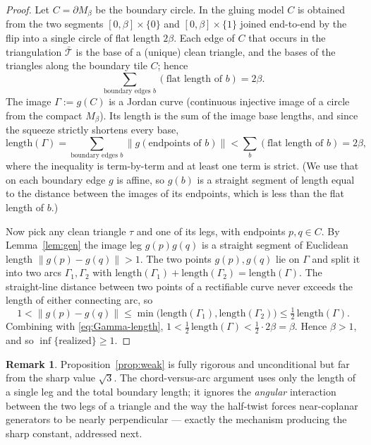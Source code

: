 \documentclass[11pt]{article}
\theoremstyle{definition}
\newtheorem{remark}{Remark}
\newcommand{\bd}{\partial}
\newcommand{\norm}[1]{\lVert #1 \rVert}
\begin{document}
\begin{proof}
Let $C=\bd M_\beta$ be the boundary circle. In the gluing model $C$ is obtained from the two
segments $[0,\beta]\times\{0\}$ and $[0,\beta]\times\{1\}$ joined end-to-end by the flip into
a single circle of flat length $2\beta$. Each edge of $C$ that occurs in the triangulation
$\bar{\mathcal T}$ is the base of a (unique) clean triangle, and the bases of the triangles
along the boundary tile $C$; hence
\begin{equation}\label{eq:boundary-length}
\sum_{\text{boundary edges }b}(\text{flat length of }b)=2\beta .
\end{equation}
The image $\Gamma:=g(C)$ is a Jordan curve (continuous injective image of a circle from the
compact $M_\beta$). Its length is the sum of the image base lengths, and since the squeeze
strictly shortens every base,
\begin{equation}\label{eq:Gamma-length}
\mathrm{length}(\Gamma)=\sum_{\text{boundary edges }b}\norm{g(\text{endpoints of }b)}
<\sum_b(\text{flat length of }b)=2\beta ,
\end{equation}
where the inequality is term-by-term and at least one term is strict. (We use that on each
boundary edge $g$ is affine, so $g(b)$ is a straight segment of length equal to the distance
between the images of its endpoints, which is less than the flat length of $b$.)

Now pick any clean triangle $\tau$ and one of its legs, with endpoints $p,q\in C$. By
Lemma~\ref{lem:gen} the image leg $g(p)g(q)$ is a straight segment of Euclidean length
$\norm{g(p)-g(q)}>1$. The two points $g(p),g(q)$ lie on $\Gamma$ and split it into two arcs
$\Gamma_1,\Gamma_2$ with $\mathrm{length}(\Gamma_1)+\mathrm{length}(\Gamma_2)=
\mathrm{length}(\Gamma)$. The straight-line distance between two points of a rectifiable
curve never exceeds the length of either connecting arc, so
\[
1<\norm{g(p)-g(q)}\le\min\bigl(\mathrm{length}(\Gamma_1),\mathrm{length}(\Gamma_2)\bigr)
\le\tfrac12\,\mathrm{length}(\Gamma).
\]
Combining with \eqref{eq:Gamma-length}, $1<\tfrac12\,\mathrm{length}(\Gamma)<\tfrac12\cdot
2\beta=\beta$. Hence $\beta>1$, and so $\inf\{\text{realized}\}\ge1$.
\end{proof}

\begin{remark}
Proposition~\ref{prop:weak} is fully rigorous and unconditional but far from the sharp value
$\sqrt3$. The chord-versus-arc argument uses only the length of a single leg and the total
boundary length; it ignores the \emph{angular} interaction between the two legs of a triangle
and the way the half-twist forces near-coplanar generators to be nearly perpendicular ---
exactly the mechanism producing the sharp constant, addressed next.
\end{remark}
\end{document}
